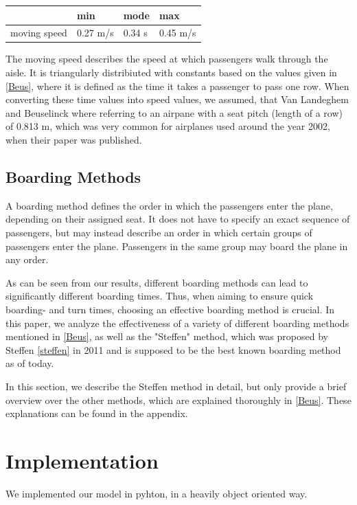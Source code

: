 \documentclass[11pt]{article}
\begin{document}
\begin{tabular}{l|l l l}

	&min &mode&max \\
	\hline
moving speed &0.27 m/s&0.34 s& 0.45 m/s   \\
	\hline
\end{tabular}
The moving speed describes the speed at which passengers walk through the aisle. It is triangularly distribiuted with constants based on the values given in \ref{Beus}, where it is defined as the time it takes a passenger to pass one row. When converting these time values into speed values, we assumed, that Van Landeghem and Beuselinck where referring to an airpane with a seat pitch (length of a row) of 0.813 m, which was very common for airplanes used around the year 2002, when their paper was published.


\subsection{Boarding Methods}
A boarding method defines the order in which the passengers enter the plane, depending on their assigned seat. It does not have to specify an exact sequence of passengers, but may instead describe an order in which certain groups of passengers enter the plane. Passengers in the same group may board the plane in any order. 


As can be seen from our results, different boarding methods can lead to significantly different boarding times. Thus, when aiming to ensure quick boarding- and turn times, choosing an effective boarding method is crucial. In this paper, we analyze the effectiveness of a variety of different boarding methods mentioned in \ref{Beus}, as well as the "Steffen" method, which was proposed by Steffen \ref{steffen} in 2011 and is supposed to be the best known boarding method as of today.


In this section, we describe the Steffen method in detail, but only provide a brief overview over the other methods, which are explained thoroughly in \ref{Beus}. These explanations can be found in the appendix.



\section{Implementation}
We implemented our model in pyhton, in a heavily object oriented way. 
\end{document}

